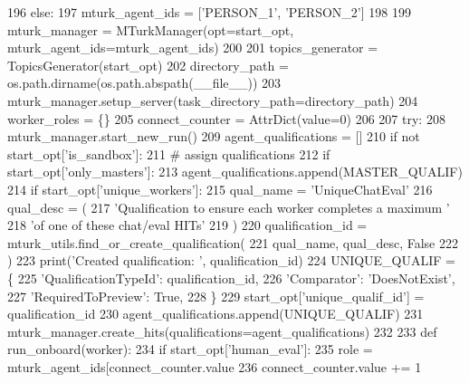 \begin{DoxyCode}
{{{{196     \textcolor{keywordflow}{else}:
197         mturk\_agent\_ids = [\textcolor{stringliteral}{'PERSON\_1'}, \textcolor{stringliteral}{'PERSON\_2'}]
198 
199     mturk\_manager = MTurkManager(opt=start\_opt, mturk\_agent\_ids=mturk\_agent\_ids)
200 
201     topics\_generator = TopicsGenerator(start\_opt)
202     directory\_path = os.path.dirname(os.path.abspath(\_\_file\_\_))
203     mturk\_manager.setup\_server(task\_directory\_path=directory\_path)
204     worker\_roles = \{\}
205     connect\_counter = AttrDict(value=0)
206 
207     \textcolor{keywordflow}{try}:
208         mturk\_manager.start\_new\_run()
209         agent\_qualifications = []
210         \textcolor{keywordflow}{if} \textcolor{keywordflow}{not} start\_opt[\textcolor{stringliteral}{'is\_sandbox'}]:
211             \textcolor{comment}{# assign qualifications}
212             \textcolor{keywordflow}{if} start\_opt[\textcolor{stringliteral}{'only\_masters'}]:
213                 agent\_qualifications.append(MASTER\_QUALIF)
214             \textcolor{keywordflow}{if} start\_opt[\textcolor{stringliteral}{'unique\_workers'}]:
215                 qual\_name = \textcolor{stringliteral}{'UniqueChatEval'}
216                 qual\_desc = (
217                     \textcolor{stringliteral}{'Qualification to ensure each worker completes a maximum '}
218                     \textcolor{stringliteral}{'of one of these chat/eval HITs'}
219                 )
220                 qualification\_id = mturk\_utils.find\_or\_create\_qualification(
221                     qual\_name, qual\_desc, \textcolor{keyword}{False}
222                 )
223                 print(\textcolor{stringliteral}{'Created qualification: '}, qualification\_id)
224                 UNIQUE\_QUALIF = \{
225                     \textcolor{stringliteral}{'QualificationTypeId'}: qualification\_id,
226                     \textcolor{stringliteral}{'Comparator'}: \textcolor{stringliteral}{'DoesNotExist'},
227                     \textcolor{stringliteral}{'RequiredToPreview'}: \textcolor{keyword}{True},
228                 \}
229                 start\_opt[\textcolor{stringliteral}{'unique\_qualif\_id'}] = qualification\_id
230                 agent\_qualifications.append(UNIQUE\_QUALIF)
231         mturk\_manager.create\_hits(qualifications=agent\_qualifications)
232 
233         \textcolor{keyword}{def }run\_onboard(worker):
234             \textcolor{keywordflow}{if} start\_opt[\textcolor{stringliteral}{'human\_eval'}]:
235                 role = mturk\_agent\_ids[connect\_counter.value %
236                 connect\_counter.value += 1
}}}}
\end{DoxyCode}
